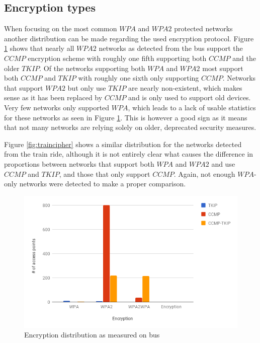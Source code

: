 \documentclass[letterpaper, 10 pt, conference]{ieeeconf}  %
\begin{document}
\subsection{Encryption types}
When focusing on the most common $WPA$ and $WPA2$ protected networks another distribution can be made regarding the used encryption protocol. Figure \ref{fig:buscipher} shows that nearly all $WPA2$ networks as detected from the bus support the $CCMP$ encryption scheme with roughly one fifth supporting both $CCMP$ and the older $TKIP$. Of the networks supporting both $WPA$ and $WPA2$ most support both $CCMP$ and $TKIP$ with roughly one sixth only supporting $CCMP$. Networks that support $WPA2$ but only use $TKIP$ are nearly non-existent, which makes sense as it has been replaced by $CCMP$ and is only used to support old devices. Very few networks only supported $WPA$, which leads to a lack of usable statistics for these networks as seen in Figure \ref{fig:buscipher}. This is however a good sign as it means that not many networks are relying solely on older, deprecated security measures. 

Figure \ref{fig:traincipher} shows a similar distribution for the networks detected from the train ride, although it is not entirely clear what causes the difference in proportions between networks that support both $WPA$ and $WPA2$ and use $CCMP$ and $TKIP$, and those that only support $CCMP$. Again, not enough $WPA$-only networks were detected to make a proper comparison.



\begin{figure}[h]
\includegraphics[scale=0.4]{Figures/CipherBus.png}
\caption{Encryption distribution as measured on bus}
\label{fig:buscipher}
\end{figure}
\end{document}

